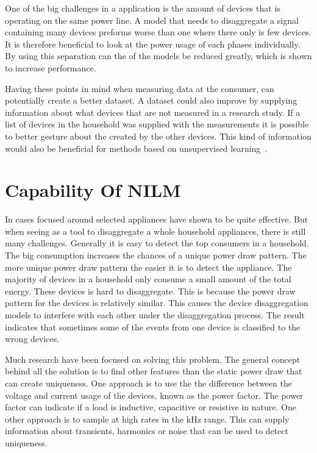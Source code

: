 One of the big challenges in a  application is the amount of devices that is operating on the same power line. A model that needs to disaggregate a signal containing many devices preforms worse than one where there only is few devices. It is therefore beneficial to look at the power usage of each phases individually. By using this separation can the  of the models be reduced greatly, which is shown to increase performance. 

Having these points in mind when measuring data at the consumer, can potentially create a better dataset. A dataset could also improve by supplying information about what devices that are not measured in a research study. If a list of devices in the household was supplied with the measurements it is possible to better gesture about the  created by the other devices. This kind of information would also be beneficial for methods based on unsupervised learning~\citep{RefWorks:19}. 

\section{Capability Of NILM}
In cases focused around selected appliances have  shown to be quite effective. But when seeing  as a tool to disaggregate a whole household appliances, there is still many challenges. Generally it is easy to detect the top consumers in a household. The big consumption increases the chances of a unique power draw pattern. The more unique power draw pattern the easier it is to detect the appliance. The majority of devices in a household only consume a small amount of the total energy. These devices is hard to disaggregate. This is because the power draw pattern for the devices is relatively similar. This causes the device disaggregation models to interfere with each other under the disaggregation process. The result indicates that sometimes some of the events from one device is classified to the wrong devices. 

Much research have been focused on solving this problem. The general concept behind all the solution is to find other features than the static power draw that can create uniqueness. One approach is to use the the difference between the voltage and current usage of the devices, known as the power factor. The power factor can indicate if a load is inductive, capacitive or resistive in nature. One other approach is to sample at high rates in the kHz range. This can supply information about transients, harmonics or noise that can be used to detect uniqueness.

